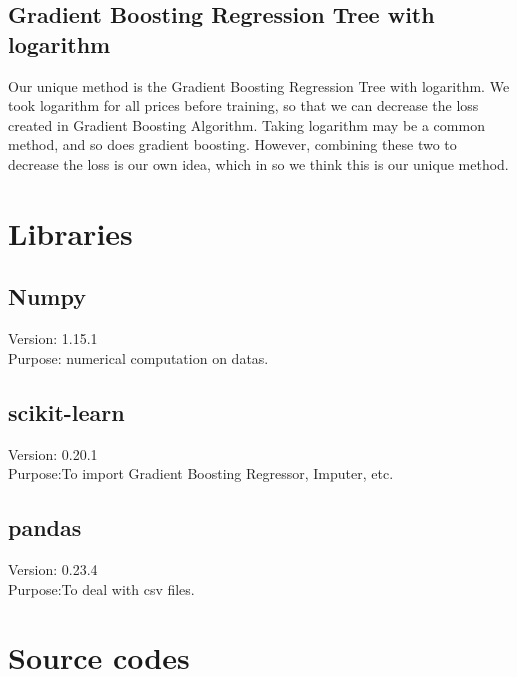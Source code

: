 \documentclass{article}
\begin{document}
\subsection{Gradient Boosting Regression Tree with logarithm}
Our unique method is the Gradient Boosting Regression Tree with logarithm. We took logarithm for all prices before training, so that we can decrease the loss created in Gradient Boosting Algorithm. Taking logarithm may be a common method, and so does gradient boosting. However, combining these two to decrease the loss is our own idea, which in so we think this is our unique method.

\section{Libraries}
\subsection{Numpy}
\noindent
Version: 1.15.1 \\
Purpose: numerical computation on datas.

\subsection{scikit-learn}
\noindent
Version: 0.20.1\\
Purpose:To import Gradient Boosting Regressor, Imputer, etc.

\subsection{pandas}
\noindent
Version: 0.23.4\\
Purpose:To deal with csv files.

\section{Source codes}
\end{document}
